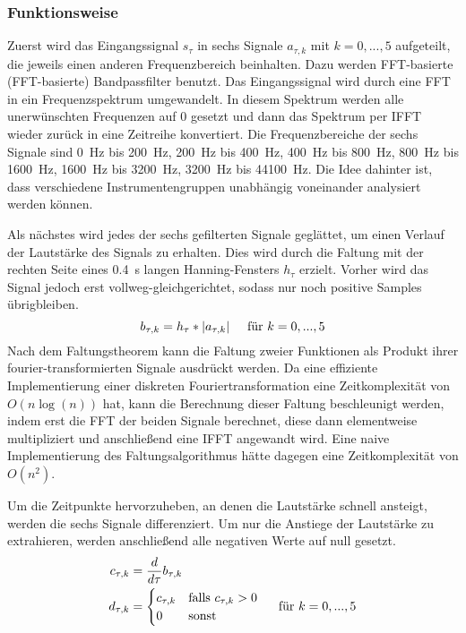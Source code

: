 {{		\subsubsection*{Funktionsweise}
		{
			Zuerst wird das Eingangssignal $s_\tau$ in sechs Signale $a_{\tau, k}$ mit $k = 0, ..., 5$ aufgeteilt,
				die jeweils einen anderen Frequenzbereich beinhalten.
			Dazu werden \acs{FFT}-basierte (\acl{FFT}-basierte) Bandpassfilter benutzt.
			Das Eingangssignal wird durch eine \ac{FFT} in ein Frequenzspektrum umgewandelt.
			In diesem Spektrum werden alle unerwünschten Frequenzen auf \num{0} gesetzt
				und dann das Spektrum per \ac{IFFT} wieder zurück in eine Zeitreihe konvertiert.
			Die Frequenzbereiche der sechs Signale sind
				\SI{0}{\hertz} bis \SI{200}{\hertz}, \SI{200}{\hertz} bis \SI{400}{\hertz},
				\SI{400}{\hertz} bis \SI{800}{\hertz}, \SI{800}{\hertz} bis \SI{1600}{\hertz},
				\SI{1600}{\hertz} bis \SI{3200}{\hertz}, \SI{3200}{\hertz} bis \SI{44100}{\hertz}.
			Die Idee dahinter ist,
				dass verschiedene Instrumentengruppen unabhängig voneinander analysiert werden können.

			Als nächstes wird jedes der sechs gefilterten Signale geglättet,
				um einen Verlauf der Lautstärke des Signals zu erhalten.
			Dies wird durch die Faltung mit der rechten Seite eines \SI{0.4}{\second} langen Hanning-Fensters $h_\tau$ erzielt.
			Vorher wird das Signal jedoch erst vollweg-gleichgerichtet,
				sodass nur noch positive Samples übrigbleiben.
			\begin{equation}
				b_{\tau, k} = h_\tau * |a_{\tau, k}| \text{\hspace{5mm}für } k = 0, ..., 5
			\end{equation}
			Nach dem Faltungstheorem kann die Faltung zweier Funktionen als Produkt ihrer fourier-transformierten Signale ausdrückt werden.
			Da eine effiziente Implementierung einer diskreten Fouriertransformation eine Zeitkomplexität von $O(n\log(n))$ hat,
				kann die Berechnung dieser Faltung beschleunigt werden,
				indem erst die \ac{FFT} der beiden Signale berechnet,
				diese dann elementweise multipliziert
				und anschlie{\ss}end eine \ac{IFFT} angewandt wird.
			Eine naive Implementierung des Faltungsalgorithmus hätte dagegen eine Zeitkomplexität von $O(n^2)$.

			Um die Zeitpunkte hervorzuheben,
				an denen die Lautstärke schnell ansteigt,
				werden die sechs Signale differenziert.
			Um nur die Anstiege der Lautstärke zu extrahieren,
				werden anschlie{\ss}end alle negativen Werte auf null gesetzt.
			\begin{align}
				c_{\tau, k} &= \frac{d}{d\tau} b_{\tau, k} \\
				d_{\tau, k} &=
					\begin{cases}
						c_{\tau, k} & \text{falls } c_{\tau, k} > 0 \\
						0           & \text{sonst}
					\end{cases}
					\text{\hspace{5mm}für } k = 0, ..., 5
			\end{align}

}}}
